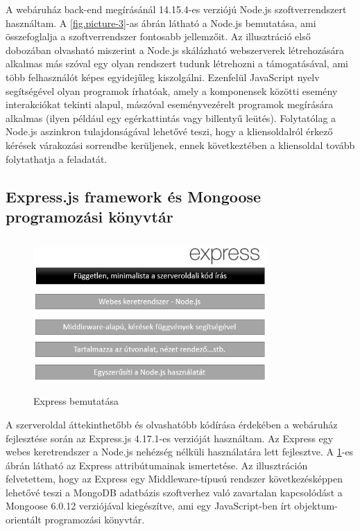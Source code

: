 A webáruház back-end megírásánál 14.15.4-es verziójú Node.js szoftverrendszert használtam. A \ref{fig.picture-3}-as ábrán látható a Node.js bemutatása, ami összefoglalja a szoftverrendszer fontosabb jellemzőit. Az illusztráció első dobozában olvasható miszerint a Node.js skálázható webszerverek létrehozására alkalmas más szóval egy olyan rendszert tudunk létrehozni a támogatásával, ami több felhasználót képes egyidejűleg kiszolgálni. Ezenfelül JavaScript nyelv segítségével olyan programok írhatóak, amely a komponensek közötti esemény interakciókat tekinti alapul, mászóval eseményvezérelt programok megírására alkalmas (ilyen például egy egérkattintás vagy billentyű leütés). Folytatólag a Node.js aszinkron tulajdonságával lehetővé teszi, hogy a kliensoldalról érkező kérések várakozási sorrendbe kerüljenek, ennek következtében a kliensoldal tovább folytathatja a feladatát. 

\subsection{Express.js framework és Mongoose programozási könyvtár}

\begin{figure}[H]
	\centering
	\includegraphics[width=0.8\textwidth,height=220px]{images/express_bemutatasa.png}
	\caption{Express bemutatása}
	\label{fig.picture-4}
\end{figure}

A szerveroldal áttekinthetőbb és olvashatóbb kódírása érdekében a webáruház fejlesztése során az Express.js 4.17.1-es verzióját használtam. Az Express egy webes keretrendszer a Node.js nehézség nélküli használatára lett fejlesztve. A \ref{fig.picture-4}-es ábrán látható az Express attribútumainak ismertetése. Az illusztráción felvetettem, hogy az Express egy Middleware-típusú rendszer következésképpen lehetővé teszi a MongoDB adatbázis szoftverhez való zavartalan kapcsolódást a Mongoose 6.0.12 verziójával kiegészítve, ami egy JavaScript-ben írt objektum-orientált programozási könyvtár.

